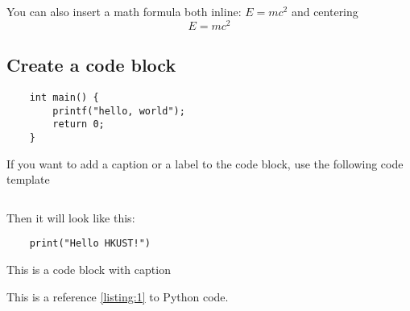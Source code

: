 \documentclass[12pt]{article}
\begin{document}
You can also insert a math formula both inline: $E = mc^2$ and centering $$E = mc^2$$

\subsection{Create a code block}

\begin{verbatim}
    int main() {
        printf("hello, world");
        return 0;
    }   
\end{verbatim}

If you want to add a caption or a label to the code block, use the following code template
\inputminted{latex}{code_template.m}

Then it will look like this:

\begin{listing}[ht]
\begin{verbatim}
    print("Hello HKUST!")
\end{verbatim}
\caption{This is a code block with caption}
\label{listing:1}
\end{listing}

This is a reference \ref{listing:1} to Python code.
\end{document}
